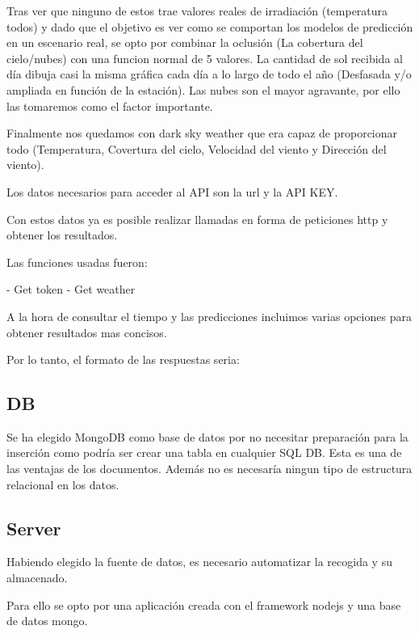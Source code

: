 Tras ver que ninguno de estos trae valores reales de irradiación (temperatura todos) y dado que el objetivo es ver como se comportan los modelos de predicción en un escenario real, se opto por combinar la oclusión (La cobertura del cielo/nubes) con una funcion normal de 5 valores. La cantidad de sol recibida al día dibuja casi la misma gráfica cada día a lo largo de todo el año (Desfasada y/o ampliada en función de la estación). Las nubes son el mayor agravante, por ello las tomaremos como el factor importante. 

Finalmente nos quedamos con dark sky weather que era capaz de proporcionar todo (Temperatura, Covertura del cielo, Velocidad del viento y Dirección del viento).

Los datos necesarios para acceder al API son la url y la API KEY.

Con estos datos ya es posible realizar llamadas en forma de peticiones http y obtener los resultados.

Las funciones usadas fueron:

- Get token
- Get weather

%

A la hora de consultar el tiempo y las predicciones incluimos varias opciones para obtener resultados mas concisos.

%

Por lo tanto, el formato de las respuestas seria:
%


\subsection{DB} 
\label{sub:DB}

Se ha elegido MongoDB como base de datos por no necesitar preparación para la inserción como podría ser crear una tabla en cualquier SQL DB. Esta es una de las ventajas de los documentos. Además no es necesaría ningun tipo de estructura relacional en los datos.


\subsection{Server} 
\label{sub:server}

Habiendo elegido la fuente de datos, es necesario automatizar la recogida y su almacenado.

Para ello se opto por una aplicación creada con el framework nodejs y una base de datos mongo.

